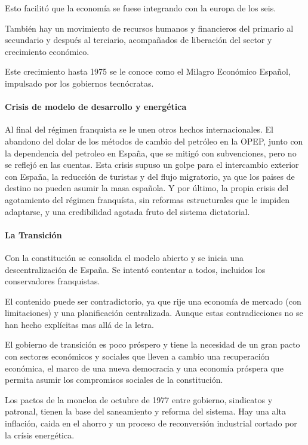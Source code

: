             Esto facilitó que la economía se fuese integrando con la europa de los seis.

            También hay un movimiento de recursos humanos y financieros del primario al secundario y después al terciario, acompañados de liberación del sector y crecimiento económico.

            Este crecimiento hasta 1975 se le conoce como el Milagro Económico Español, impulsado por los gobiernos tecnócratas.

        \paragraph{Crisis de modelo de desarrollo y energética} %
            Al final del régimen franquista se le unen otros hechos internacionales. El abandono del dolar de los métodos de cambio del petróleo en la OPEP, junto con la dependencia del petroleo en España, que se mitigó con subvenciones, pero no se reflejó en las cuentas. Esta crisis supuso un golpe para el intercambio exterior con España, la reducción de turistas y del flujo migratorio, ya que los paises de destino no pueden asumir la masa española. Y por último, la propia crisis del agotamiento del régimen franquísta, sin reformas estructurales que le impiden adaptarse, y una credibilidad agotada fruto del sistema dictatorial.

        \paragraph{La Transición} %
            Con la constitución se consolida el modelo abierto y se inicia una descentralización de España. Se intentó contentar a todos, incluidos los conservadores franquistas.

            El contenido puede ser contradictorio, ya que rije una economía de mercado (con limitaciones) y una planificación centralizada. Aunque estas contradicciones no se han hecho explícitas mas allá de la letra.

            El gobierno de transición es poco próspero y tiene la necesidad de un gran pacto con sectores económicos y sociales que lleven a cambio una recuperación económica, el marco de una nueva democracia y una economía próspera que permita asumir los compromisos sociales de la constitución.

            Los pactos de la moncloa de octubre de 1977 entre gobierno, sindicatos y patronal, tienen la base del saneamiento y reforma del sistema. Hay una alta inflación, caida en el ahorro y un proceso de reconversión industrial cortado por la crísis energética. 

